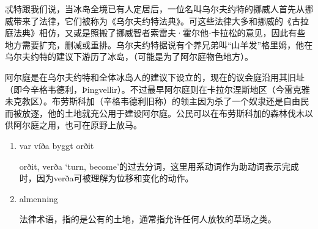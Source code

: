 \begin{translation*}{}
    忒特跟我们说，当冰岛全境已有人定居后，一位名叫乌尔夫约特的挪威人首先从挪威带来了法律，它们被称为《乌尔夫约特法典》。可这些法律大多和挪威的《古拉庭法典》相仿，又或是照搬了挪威智者索雷夫·霍尔他-卡拉松的意见，因此有些地方需要扩充，删减或重排。乌尔夫约特据说有个养兄弟叫“山羊发”格里姆，他在乌尔夫约特的建议下游历了冰岛，（可能是为了阿尔庭物色地方）。

    阿尔庭是在乌尔夫约特和全体冰岛人的建议下设立的，现在的议会庭沿用其旧址（即今辛格韦德利，Þingvellir）。不过最早阿尔庭则在卡拉尔涅斯地区（今雷克雅未克教区）。布劳斯科加（辛格韦德利旧称）的领主因为杀了一个奴隶还是自由民而被放逐，他的土地就充公用于建设阿尔庭。公民可以在布劳斯科加的森林伐木以供阿尔庭之用，也可在原野上放马。
\end{translation*}
\begin{grammar*}{}
    \begin{enumerate}[leftmargin=*]
        \item var víða byggt orðit

              orðit, verða `turn, become'的过去分词，这里用系动词作为助动词表示完成时，因为verða可被理解为位移和变化的动作。
        \item almenning

              法律术语，指的是公有的土地，通常指允许任何人放牧的草场之类。
    \end{enumerate}
\end{grammar*}

